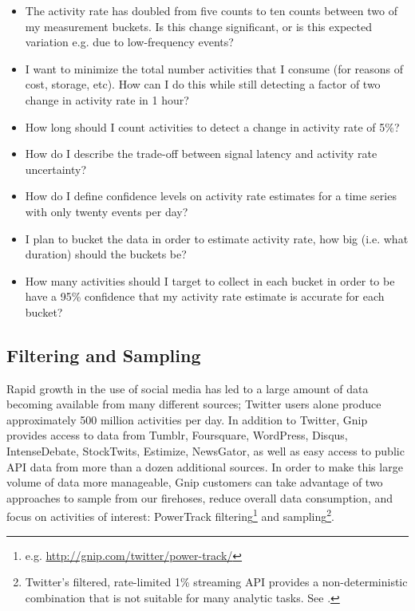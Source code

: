 \documentclass{article}
\begin{document}
\begin{itemize}
	\item The activity rate has doubled from five counts to ten counts between two of my measurement 
buckets. Is this change significant, or is this expected variation e.g. due to low-frequency events?
	\item I want to minimize the total number activities that I consume (for reasons of cost, storage, etc). 
How can I do this while still detecting a factor of two change in activity rate in 1 hour?
	\item How long should I count activities to detect a change in activity rate of 5\%?
	\item How do I describe the trade-off between signal latency and activity rate uncertainty?
	\item How do I define confidence levels on activity rate estimates for a time series with only twenty 
events per day?
	\item I plan to bucket the data in order to estimate activity rate, how big (i.e. what duration) should 
the buckets be? 
	\item How many activities should I target to collect in each bucket in order to be have a 95\% 
confidence that my activity rate estimate is accurate for each bucket? 
\end{itemize}


\subsection{Filtering and Sampling} 
\label{filter}


Rapid growth in the use of social media has led to a large amount of data becoming available 
from many different sources; Twitter users alone produce approximately 500 million activities per day. 
In addition to Twitter, Gnip provides access to data from Tumblr, Foursquare, WordPress, Disqus, 
IntenseDebate, StockTwits, Estimize, NewsGator, as well as easy access to public API data from more than a dozen 
additional sources. In order to make this large volume of data more manageable, Gnip customers can take 
advantage of two approaches to sample from our firehoses, reduce overall data consumption, and focus 
on activities of interest: PowerTrack filtering\footnote{e.g. \url{http://gnip.com/twitter/power-track/} } 
and sampling\footnote{Twitter's filtered, rate-limited 1\% streaming API provides a non-deterministic 
combination that is not suitable for many analytic tasks.  See \cite{Morstatter:2013}.}. 
\end{document}
